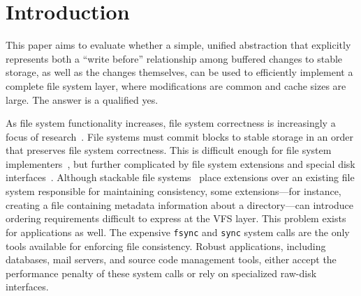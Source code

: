 
\section {Introduction}
\label{sec:intro}

\begin{comment}
This paper aims to evaluate whether a simple, unified abstraction that
represents all modifications to stable storage, including
\emph{dependencies} among modifications, can be used to efficiently
implement a complete file system layer, where modifications are common
and cache sizes are large.
%
The answer is a qualified yes.
\end{comment}

This paper aims to evaluate whether a simple, unified abstraction that
explicitly represents both a ``write before'' relationship among
buffered changes to stable storage, as well as the changes themselves,
can be used to efficiently implement a complete file system layer, where
modifications are common and cache sizes are large.
%
The answer is a qualified yes.


As file system functionality increases, file system correctness is
 increasingly a focus of
 research~\cite{sivathanuetal05-logic,denehyetal05-journal-guided}.
%
File systems must commit blocks to stable storage in an order that
 preserves file system correctness.
%
This is difficult enough for file system
 implementers~\cite{tweedie98journaling,mckusick99soft}, but further
 complicated by file system extensions and special disk interfaces~\cite{soules03metadata,fast04versionfs,quinlan02venti,cornell04wayback,wright03ncryptfs,sivathanu03semantically-smart,sivathanu05database-aware}.
%
Although stackable file
 systems~\cite{zadok00fist,zadok99extending,heidemann94filesystem,rosenthal90evolving}
 place extensions over an existing file system responsible for maintaining
 consistency, some extensions---for instance, creating a file containing
 metadata information about a directory---can introduce ordering
 requirements difficult to express at the VFS layer.
%
This problem exists for applications as well.
%
The expensive \texttt{fsync} and \texttt{sync} system calls are the only
 tools available for enforcing file consistency.
%
Robust applications, including databases, mail servers, and source code
 management tools, either accept the performance penalty of these system
 calls or rely on specialized raw-disk interfaces.


